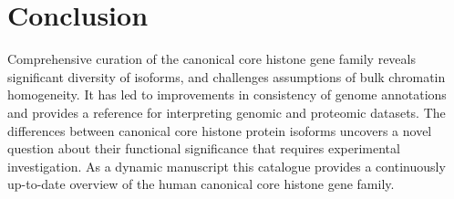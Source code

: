 \section{Conclusion}
\label{sec:conclusion}

  Comprehensive curation of the canonical core histone gene family
  reveals significant diversity of isoforms,
  and challenges assumptions of bulk chromatin homogeneity.
  It has led to improvements in consistency of genome annotations
  and provides a reference for interpreting genomic and proteomic datasets.
  The differences between canonical core histone protein isoforms
  uncovers a novel question about their functional significance 
  that requires experimental investigation.
  As a dynamic manuscript this catalogue provides a continuously up-to-date overview
  of the human canonical core histone gene family.
